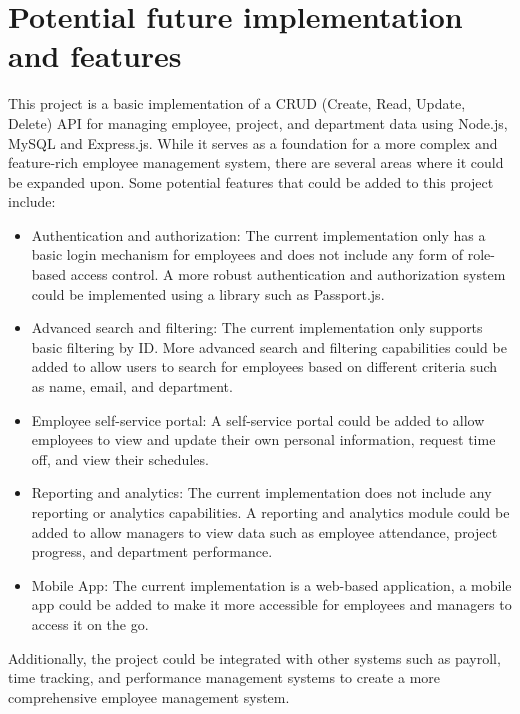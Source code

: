 \documentclass[12pt]{article}
\begin{document}
\section*{Potential future implementation and features}
This project is a basic implementation of a CRUD (Create, Read, Update, Delete) API for managing employee, project, and department data using Node.js, MySQL and Express.js. While it serves as a foundation for a more complex and feature-rich employee management system, there are several areas where it could be expanded upon. Some potential features that could be added to this project include:
\begin{itemize}
\item Authentication and authorization: The current implementation only has a basic login mechanism for employees and does not include any form of role-based access control. A more robust authentication and authorization system could be implemented using a library such as Passport.js.
\item Advanced search and filtering: The current implementation only supports basic filtering by ID. More advanced search and filtering capabilities could be added to allow users to search for employees based on different criteria such as name, email, and department.
\item Employee self-service portal: A self-service portal could be added to allow employees to view and update their own personal information, request time off, and view their schedules.
\item Reporting and analytics: The current implementation does not include any reporting or analytics capabilities. A reporting and analytics module could be added to allow managers to view data such as employee attendance, project progress, and department performance.
\item Mobile App: The current implementation is a web-based application, a mobile app could be added to make it more accessible for employees and managers to access it on the go.
\end{itemize}
Additionally, the project could be integrated with other systems such as payroll, time tracking, and performance management systems to create a more comprehensive employee management system.
\end{document}
